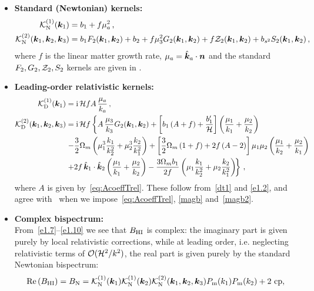 \begin{itemize}
\item
{\bfseries Standard (Newtonian) kernels:}
\begin{align}
\mathcal{K}^{(1)}_\mathrm{N}(\bm {k}_1) &= b_1 + f\mu_{a}^{2}\,,  \label{e1.7} \\ 
\mathcal{K}^{(2)}_\mathrm{N}(\bm {k}_1,\bm {k}_2,\bm {k}_3) &= b_1 F_2(\bm {k}_1,\bm {k}_2) + b_2 + f\mu_{3}^{2} G_2(\bm {k}_1,\bm {k}_2) + f \mathcal{Z}_2(\bm {k}_1,\bm {k}_2)
+ b_{s^{2}}S_{2}(\bm {k}_1,\bm {k}_2)\,, \label{e1.8}
\end{align}
where $f$ is the linear matter growth rate, $\mu_a=\hat{\bm {k}}_a\cdot\bm {n}$ and the standard $F_2,G_2,\mathcal{Z}_2,S_2$ kernels are given in \cite{Maartens:2019yhx}.

\item
{\bfseries Leading-order relativistic kernels:} 
\begin{align}
\mathcal{K}^{(1)}_{\mathrm{D}}(\bm {k}_1) &= \mathrm{i\,} \mathcal{H} f A\,\frac{\mu_{a}}{k_{a}}\,, \label{e1.9} \\
\mathcal{K}^{(2)}_{\mathrm{D}}(\bm {k}_1,\bm {k}_2,\bm {k}_3) &= \mathrm{i\,} \mathcal{H} f \left\{
A\,\frac{\mu_{3}}{k_{3}} G_{2}(\bm {k}_1,\bm {k}_2)
+{\left[ b_1\left( A+f \right) + \frac{b_1'}{\mathcal{H}} \right]}\left(\frac{\mu_{1}}{k_{1}} + \frac{\mu_{2}}{k_{2}}\right) \right.
\nonumber \\
& \left. -\frac{3}{2}\Omega_m \left(\mu_{1}^{3} \frac{k_{1}}{k_{2}^{2}} + \mu_{2}^{3}\frac{k_{2}}{k_{1}^{2}}\right)
+ \left[\frac{3}{2}\Omega_m \left(1+f \right)+2f\left(A-2\right) \right] \mu_{1}\mu_{2}\left(\frac{\mu_{1}}{k_{2}}+\frac{\mu_{2}}{k_{1}}\right) \right.
\nonumber \\
& \left. + 2 f \,  {\hat{\bm{k}}_{1} \cdot \hat{\bm{k}}_2}\left(\frac{\mu_{1}}{k_{1}} + \frac{\mu_{2}}{k_{2}}\right) 
-\frac{3\Omega_m b_1}{2f} \left(\mu_{1}\frac{k_{1}}{k_{2}^{2}} + \mu_{2}\frac{k_{2}}{k_{1}^{2}}\right)\!  \right\}\,,\label{e1.10}
\end{align}
where $A$ is given by~\eqref{eq:AcoeffTrel}. These follow from~\eqref{dt1} and \eqref{e1.2}, and {agree with~\cite{Maartens:2019yhx} when we impose~\eqref{eq:AcoeffTrel}, \eqref{magb} and~\eqref{magb2}}.
\item
{\bfseries Complex bispectrum:}\\
From~\eqref{e1.7}--\eqref{e1.10} we see that
$B_{{\mathrm{HI}}}$ is complex: {the imaginary part is given purely by local relativistic corrections, while at leading order, i.e. neglecting relativistic terms of $\mathcal{O}(\mathcal{H}^2/k^2)$, the real part is given purely by the standard Newtonian bispectrum:}
\begin{align}
\mathrm{Re}\left( B_{\hi} \right) &= B_\mathrm{N} = \mathcal{K}^{(1)}_\mathrm{N}(\ka) \mathcal{K}^{(1)}_\mathrm{N}(\kb) \mathcal{K}^{(2)}_\mathrm{N}(\ka,\kb,\kc)P_\mathrm{m} (k_{1}) P_\mathrm{m} (k_{2}) + \text{2 cp}, \label{e1.14}\\

\end{align}
\end{itemize}

